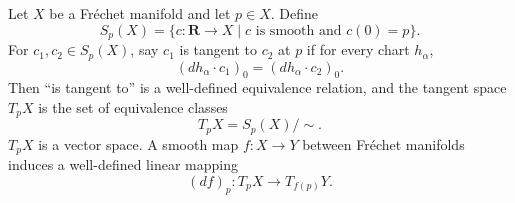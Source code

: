 Let $X$ be a Fr\'{e}chet manifold and let $p \in X$. Define
$$
S_p(X) = \{ c: \mathbf{R} \to X \mid c \text{ is smooth and } c(0) = p \}.
$$
For $c_1, c_2 \in S_p(X)$, say $c_1$ is tangent to $c_2$ at $p$ if for every chart $h_\alpha$,
$$
(dh_\alpha \cdot c_1)_0 = (dh_\alpha \cdot c_2)_0.
$$
Then ``is tangent to'' is a well-defined equivalence relation, and the tangent space $T_p X$ is the set of equivalence classes
$$
T_p X = S_p(X) / \sim.
$$
$T_p X$ is a vector space. A smooth map $f: X \to Y$ between Fr\'{e}chet manifolds induces a well-defined linear mapping
$$
(df)_p: T_p X \to T_{f(p)} Y.
$$
